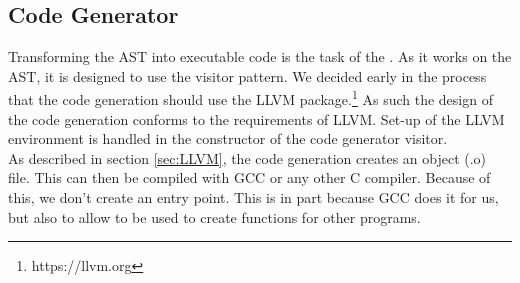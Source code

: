 \subsection{Code Generator}
\label{sec:codeGeneratorDesign}
Transforming the AST into executable code is the task of the \codeGen. As it works on the AST, it is designed to use the visitor pattern. We decided early in the process that the code generation should use the LLVM package.\footnote{https://llvm.org} As such the design of the code generation conforms to the requirements of LLVM. Set-up of the LLVM environment is handled in the constructor of the code generator visitor.\\
As described in section \ref{sec:LLVM}, the code generation creates an object (.o) file. This can then be compiled with GCC or any other C compiler. Because of this, we don't create an entry point. This is in part because GCC does it for us, but also to allow \lang{} to be used to create functions for other programs. 